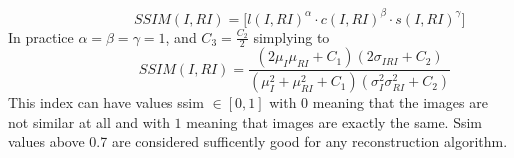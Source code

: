 \begin{equation} \label{eq:ssim1}
\hspace{3em} \hspace{3em} \hspace{3em} SSIM(I,RI)= \big[ l(I,RI)^{\alpha} \cdot c(I,RI)^{\beta} \cdot s(I,RI)^{\gamma} \big]   \enspace \enspace \hspace{3em}
\end{equation}
In practice $\alpha = \beta = \gamma = 1$, and $C_3 = \frac{C_2}{2}$ simplying to
\begin{equation} \label{eq:ssim2}
\hspace{3em} \hspace{3em} \hspace{3em} SSIM(I,RI)= \frac{(2\mu_{I} \mu_{RI} + C_1)(2\sigma_{IRI}+C_2)}{(\mu_{I}^2 + \mu_{RI}^2 + C_1)(\sigma_{I}^2 \sigma_{RI}^2 + C_2)}   \enspace \enspace \hspace{3em}
\end{equation}
This index can have values ssim $\in [0,1]$ with $0$ meaning that the images are not similar at all and with $1$ meaning that images are exactly the same. Ssim values above 0.7 are considered sufficently good for any reconstruction algorithm.  

    
 


  

